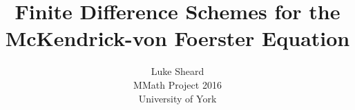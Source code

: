 \documentclass[11pt, a4paper]{report}
\title{Finite Difference Schemes for the McKendrick-von Foerster Equation}
\author{
  Luke Sheard \\
  MMath Project 2016 \\
  University of York
}
\theoremstyle{definition}
\theoremstyle{plain}
\begin{document}
  \def\biblio{}
  \raggedright
  \allowdisplaybreaks

  

  

  

  

  

  \begin{appendix}
  \end{appendix}

  \newpage
  
  
\end{document}
